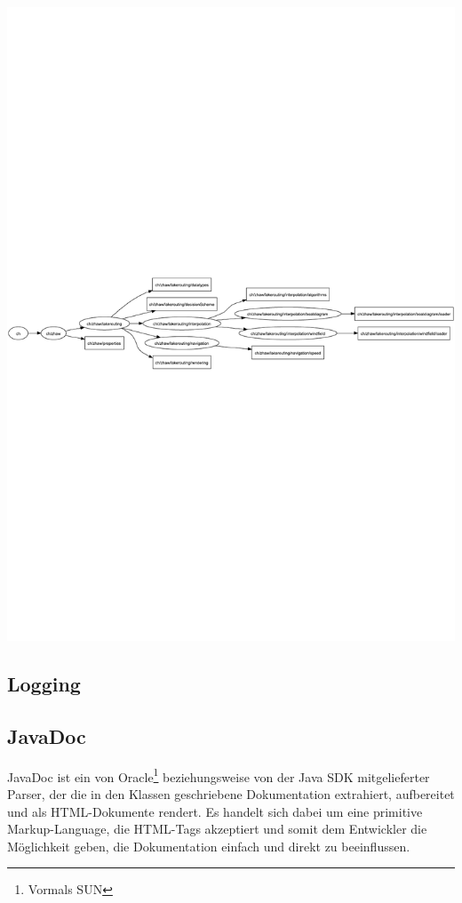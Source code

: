 \documentclass[a4paper,10pt]{article}
\begin{document}
\begin{minipage}[b]{0.5\linewidth}
\centering
\includegraphics[width=\textheight, angle=90]{img/ArchitectureGraph-ch}
\end{minipage}
\subsection{Logging}

\subsection{JavaDoc}
JavaDoc ist ein von Oracle\footnote{Vormals SUN} beziehungsweise von der Java
SDK mitgelieferter Parser, der die in den Klassen geschriebene Dokumentation
extrahiert, aufbereitet und als HTML-Dokumente rendert. Es handelt sich dabei
um eine primitive Markup-Language, die HTML-Tags akzeptiert und somit dem
Entwickler die Möglichkeit geben, die Dokumentation einfach und direkt zu
beeinflussen.
\end{document}
